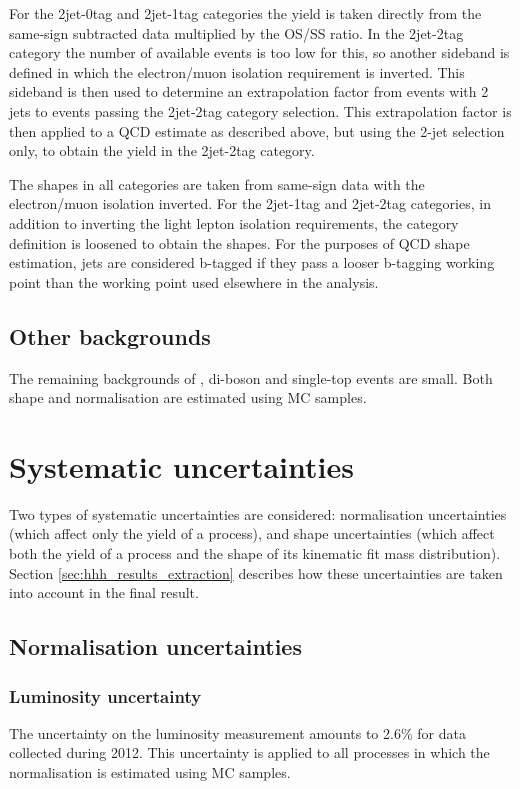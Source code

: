For the 2jet-0tag and 2jet-1tag categories the yield is taken directly from
the same-sign subtracted data multiplied by the OS/SS ratio. In the 2jet-2tag
category the number of available events is too low for this, so another sideband is defined
in which the electron/muon isolation requirement is inverted. This 
sideband is then used to determine an extrapolation factor from events
with 2 jets to events passing the 2jet-2tag category selection. This extrapolation
factor is then applied to a QCD estimate as described above, but using the 2-jet 
selection only, to obtain the yield in the 2jet-2tag category.

The shapes in all categories are taken from same-sign data with the electron/muon
isolation inverted. For the 2jet-1tag and 2jet-2tag categories, in addition to 
inverting the light lepton isolation requirements, the category definition
is loosened to obtain the shapes. For the purposes of QCD shape
estimation, jets are considered b-tagged if they pass a looser b-tagging
working point than the working point used elsewhere in the analysis.
\subsection{Other backgrounds}
\label{sec:hhh_backgrounds_other}
The remaining backgrounds of \Zellell, di-boson and single-top
events are small. Both shape and normalisation are
estimated using \ac{MC} samples.
 
\section{Systematic uncertainties}
\label{sec:hhh_uncs}
Two types of systematic uncertainties are considered: normalisation
uncertainties (which affect only the yield of a process), and shape
uncertainties (which affect both the yield of a process and the shape of its kinematic fit mass distribution). Section \ref{sec:hhh_results_extraction}
describes how these uncertainties are taken into account in the final result.
\subsection{Normalisation uncertainties}
\label{sec:hhh_uncs_norm}
\subsubsection*{Luminosity uncertainty}
The uncertainty on the luminosity measurement amounts to 2.6\% \cite{CMS-PAS-LUM-13-001} for data collected during
2012. This uncertainty is applied to all processes in which
the normalisation is estimated using MC samples.
